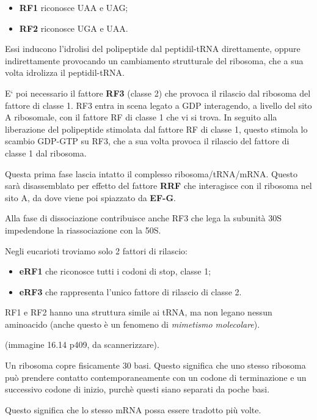 \documentclass[11pt]{book}
\begin{document}
\begin{itemize}
\itemsep1pt\parskip0pt
\item
  \textbf{RF1} riconosce UAA e UAG;
\item
  \textbf{RF2} riconosce UGA e UAA.
\end{itemize}

Essi inducono l'idrolisi del polipeptide dal peptidil-tRNA direttamente,
oppure indirettamente provocando un cambiamento strutturale del
ribosoma, che a sua volta idrolizza il peptidil-tRNA.

E` poi necessario il fattore \textbf{RF3} (classe 2) che provoca il
rilascio dal ribosoma del fattore di classe 1. RF3 entra in scena legato
a GDP interagendo, a livello del sito A ribosomale, con il fattore RF di
classe 1 che vi si trova. In seguito alla liberazione del polipeptide
stimolata dal fattore RF di classe 1, questo stimola lo scambio GDP-GTP
su RF3, che a sua volta provoca il rilascio del fattore di classe 1 dal
ribosoma.

Questa prima fase lascia intatto il complesso ribosoma/tRNA/mRNA. Questo
sarà disassemblato per effetto del fattore \textbf{RRF} che interagisce
con il ribosoma nel sito A, da dove viene poi spiazzato da
\textbf{EF-G}.

Alla fase di dissociazione contribuisce anche RF3 che lega la subunità
30S impedendone la riassociazione con la 50S.

Negli eucarioti troviamo solo 2 fattori di rilascio:

\begin{itemize}
\itemsep1pt\parskip0pt
\item
  \textbf{eRF1} che riconosce tutti i codoni di stop, classe 1;
\item
  \textbf{eRF3} che rappresenta l'unico fattore di rilascio di classe 2.
\end{itemize}

RF1 e RF2 hanno una struttura simile ai tRNA, ma non legano nessun
aminoacido (anche questo è un fenomeno di \emph{mimetismo molecolare}).

(immagine 16.14 p409, da scannerizzare).

Un ribosoma copre fisicamente 30 basi. Questo significa che uno stesso
ribosoma può prendere contatto contemporaneamente con un codone di
terminazione e un successivo codone di inizio, purchè questi siano
separati da poche basi.

Questo significa che lo stesso mRNA possa essere tradotto più volte.
\end{document}
